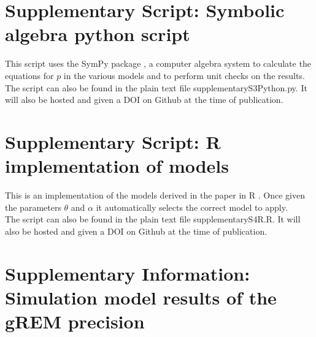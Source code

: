 \documentclass[a4paper,10pt,reqno,oneside]{amsart}
\begin{document}
\vspace{1cm}

	
	

\clearpage
\section{Supplementary Script: Symbolic algebra python script}

\noindent This script uses the SymPy package \citep{sympy}, a computer algebra system to calculate the equations for $p$ in the various models and to perform unit checks on the results.
\vspace{0.3cm}\\
\noindent The script can also be found in the plain text file supplementaryS3Python.py. It will also be hosted and given a DOI on Github at the time of publication.
\vspace{0.5cm}



\clearpage
\section{Supplementary Script: R implementation of models}


\noindent This is an implementation of the models derived in the paper in R \citep{R}. Once given the parameters $\theta$ and $\alpha$ it automatically selects the correct model to apply.
\vspace{0.3cm}\\
\noindent The script can also be found in the plain text file supplementaryS4R.R. It will also be hosted and given a DOI on Github at the time of publication.

\vspace{0.5cm}


\clearpage
\section{Supplementary Information: Simulation model results of the gREM precision}
\setcounter{figure}{0}    
\end{document}
